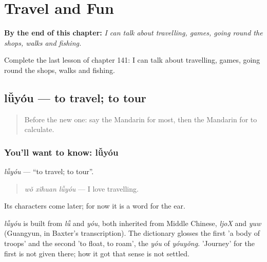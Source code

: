 
\chapter{Travel and Fun}
\label{ch:zh-travel-and-fun}

\begin{chapteropening}
\textbf{By the end of this chapter:} \emph{I can talk about travelling, games, going round the shops, walks and fishing.}

Complete the last lesson of chapter 141: I can talk about travelling, games, going round the shops, walks and fishing.
\end{chapteropening}

\section[lǚyóu]{lǚyóu — to travel; to tour}

\label{lesson:ZH-C141-luyou}



\begin{quote}
Before the new one: say the Mandarin for most, then the Mandarin for to calculate.
\end{quote}

\subsection*{You'll want to know: lǚyóu}
\emph{lǚyóu} — \textquotedblleft{}to travel; to tour\textquotedblright{}.

\begin{quote}
\emph{wǒ xǐhuan lǚyóu} — I love travelling.
\end{quote}

Its characters come later; for now it is a word for the ear.

\begin{cousinweb}
\emph{lǚyóu} is built from \emph{lǚ} and \emph{yóu}, both inherited from Middle Chinese, \emph{ljoX} and \emph{yuw} (Guangyun, in Baxter's transcription). The dictionary glosses the first 'a body of troops' and the second 'to float, to roam', the \emph{yóu} of \emph{yóuyǒng}. 'Journey' for the first is not given there; how it got that sense is not settled.
\end{cousinweb}


